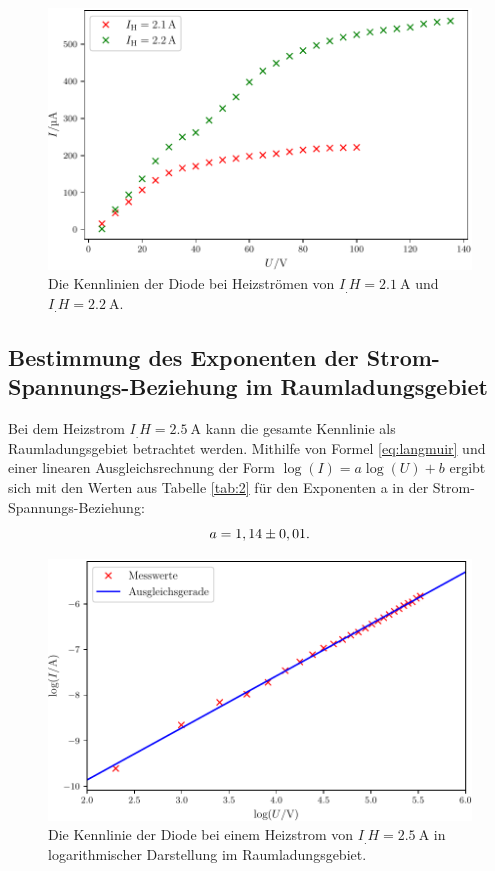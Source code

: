 \begin{figure}
\centering
\includegraphics[width=\linewidth-70pt,height=\textheight-70pt,keepaspectratio]{content/images/IH_21-2.pdf}
\caption{Die Kennlinien der Diode bei Heizströmen von $I_.H=\SI{2,1}{\ampere}$ und $I_.H=\SI{2,2}{\ampere}$.}
\label{fig:Kennlinien2}
\end{figure}

\subsection{Bestimmung des Exponenten der Strom-Spannungs-Beziehung im Raumladungsgebiet}
\label{subsec:Exponent}

Bei dem Heizstrom $I_.H=\SI{2,5}{\ampere}$ kann die gesamte Kennlinie als Raumladungsgebiet betrachtet werden.
Mithilfe von Formel \eqref{eq:langmuir} und einer linearen Ausgleichsrechnung der Form $\log(I)=a\log(U)+b$ ergibt sich mit den Werten aus Tabelle \ref{tab:2} für den Exponenten a in der Strom-Spannungs-Beziehung:
\[
a = 1,14\pm0,01\text{.}\\
\]

\begin{figure}
\centering
\includegraphics[width=\linewidth-70pt,height=\textheight-70pt,keepaspectratio]{content/images/IH_25_log.pdf}
\caption{Die Kennlinie der Diode bei einem Heizstrom von $I_.H=\SI{2,5}{\ampere}$ in logarithmischer Darstellung im Raumladungsgebiet.}
\label{fig:Kennlinie25_log}
\end{figure}

